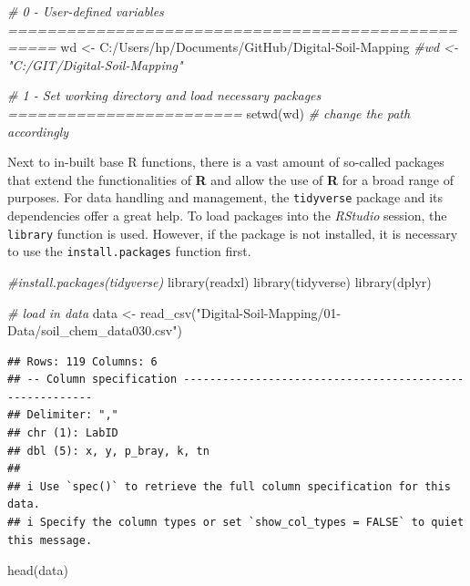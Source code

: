 \documentclass[
  10pt,
  b5paper,
  oneside]{book}
\newenvironment{Shaded}{\begin{snugshade}}{\end{snugshade}}
\newcommand{\CommentTok}[1]{\textcolor[rgb]{0.56,0.35,0.01}{\textit{#1}}}
\newcommand{\FunctionTok}[1]{\textcolor[rgb]{0.00,0.00,0.00}{#1}}
\newcommand{\NormalTok}[1]{#1}
\newcommand{\OtherTok}[1]{\textcolor[rgb]{0.56,0.35,0.01}{#1}}
\newcommand{\StringTok}[1]{\textcolor[rgb]{0.31,0.60,0.02}{#1}}
\begin{document}
\begin{Shaded}
\begin{Highlighting}[]
\CommentTok{\# 0 {-} User{-}defined variables ===================================================}
\NormalTok{wd }\OtherTok{\textless{}{-}} \StringTok{\textquotesingle{}C:/Users/hp/Documents/GitHub/Digital{-}Soil{-}Mapping\textquotesingle{}}
\CommentTok{\#wd \textless{}{-} "C:/GIT/Digital{-}Soil{-}Mapping"}

\CommentTok{\# 1 {-} Set working directory and load necessary packages ========================}
\FunctionTok{setwd}\NormalTok{(wd) }\CommentTok{\# change the path accordingly}
\end{Highlighting}
\end{Shaded}

Next to in-built base R functions, there is a vast amount of so-called packages that extend the functionalities of \textbf{R} and allow the use of \textbf{R} for a broad range of purposes. For data handling and management, the \texttt{tidyverse} package and its dependencies offer a great help. To load packages into the \emph{RStudio} session, the \texttt{library} function is used. However, if the package is not installed, it is necessary to use the \texttt{install.packages} function first.

\begin{Shaded}
\begin{Highlighting}[]
\CommentTok{\#install.packages(tidyverse)}
\FunctionTok{library}\NormalTok{(readxl)}
\FunctionTok{library}\NormalTok{(tidyverse)}
\FunctionTok{library}\NormalTok{(dplyr)}

\CommentTok{\# load in data}
\NormalTok{data }\OtherTok{\textless{}{-}} \FunctionTok{read\_csv}\NormalTok{(}\StringTok{"Digital{-}Soil{-}Mapping/01{-}Data/soil\_chem\_data030.csv"}\NormalTok{)}
\end{Highlighting}
\end{Shaded}

\begin{verbatim}
## Rows: 119 Columns: 6
## -- Column specification --------------------------------------------------------
## Delimiter: ","
## chr (1): LabID
## dbl (5): x, y, p_bray, k, tn
## 
## i Use `spec()` to retrieve the full column specification for this data.
## i Specify the column types or set `show_col_types = FALSE` to quiet this message.
\end{verbatim}

\begin{Shaded}
\begin{Highlighting}[]
\FunctionTok{head}\NormalTok{(data)}
\end{Highlighting}
\end{Shaded}
\end{document}
